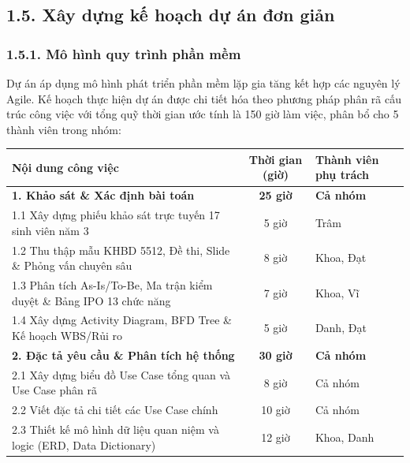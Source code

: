 \subsection{1.5. Xây dựng kế hoạch dự án đơn giản}

\subsubsection{1.5.1. Mô hình quy trình phần mềm}
Dự án áp dụng mô hình phát triển phần mềm lặp gia tăng kết hợp các nguyên lý Agile. Kế hoạch thực hiện dự án được chi tiết hóa theo phương pháp phân rã cấu trúc công việc với tổng quỹ thời gian ước tính là 150 giờ làm việc, phân bổ cho 5 thành viên trong nhóm:

\begin{table}[H]
\centering
\small
\renewcommand{\arraystretch}{1.2}
\begin{tabularx}{\textwidth}{|X|c|p{3.2cm}|}
\hline
\rowcolor[HTML]{EAEAEA}
\textbf{Nội dung công việc} & \textbf{Thời gian (giờ)} & \textbf{Thành viên phụ trách} \\
\hline
\textbf{1. Khảo sát \& Xác định bài toán} & \textbf{25 giờ} & \textbf{Cả nhóm} \\
\hline
\hspace{0.3cm} 1.1 Xây dựng phiếu khảo sát trực tuyến 17 sinh viên năm 3 & 5 giờ & Trâm \\
\hline
\hspace{0.3cm} 1.2 Thu thập mẫu KHBD 5512, Đề thi, Slide \& Phỏng vấn chuyên sâu & 8 giờ & Khoa, Đạt \\
\hline
\hspace{0.3cm} 1.3 Phân tích As-Is/To-Be, Ma trận kiểm duyệt \& Bảng IPO 13 chức năng & 7 giờ & Khoa, Vĩ \\
\hline
\hspace{0.3cm} 1.4 Xây dựng Activity Diagram, BFD Tree \& Kế hoạch WBS/Rủi ro & 5 giờ & Danh, Đạt \\
\hline
\textbf{2. Đặc tả yêu cầu \& Phân tích hệ thống} & \textbf{30 giờ} & \textbf{Cả nhóm} \\
\hline
\hspace{0.3cm} 2.1 Xây dựng biểu đồ Use Case tổng quan và Use Case phân rã & 8 giờ & Cả nhóm \\
\hline
\hspace{0.3cm} 2.2 Viết đặc tả chi tiết các Use Case chính & 10 giờ & Cả nhóm \\
\hline
\hspace{0.3cm} 2.3 Thiết kế mô hình dữ liệu quan niệm và logic (ERD, Data Dictionary) & 12 giờ & Khoa, Danh \\

\end{tabularx}
\end{table}
